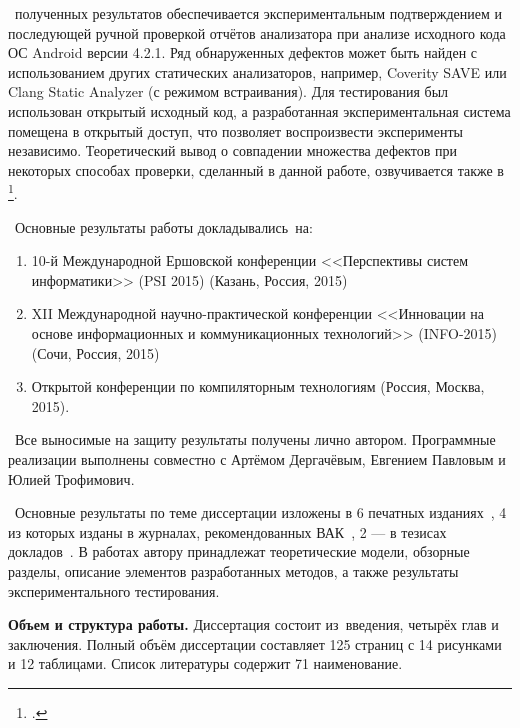 \reliability\ полученных результатов обеспечивается экспериментальным подтверждением и последующей ручной проверкой отчётов анализатора при анализе исходного кода ОС Android версии 4.2.1. Ряд обнаруженных дефектов может быть найден с использованием других статических анализаторов, например, Coverity SAVE или Clang Static Analyzer (с режимом встраивания). Для тестирования был использован открытый исходный код, а разработанная экспериментальная система помещена в открытый доступ, что позволяет воспроизвести эксперименты независимо. Теоретический вывод о совпадении множества дефектов при некоторых способах проверки, сделанный в данной работе, озвучивается также в \footcite{godefroid-comp}.

\probation\
Основные результаты работы докладывались~на:
\begin{enumerate}
 \item 10-й Международной Ершовской конференции <<Перспективы систем информатики>> (PSI 2015) (Казань, Россия, 2015)
 \item XII Международной научно-практической конференции <<Инновации на основе информационных и коммуникационных технологий>> (INFO-2015) (Сочи, Россия, 2015)
 \item Открытой конференции по компиляторным технологиям (Россия, Москва, 2015).
\end{enumerate}


\contribution\ Все выносимые на защиту результаты получены лично автором. Программные реализации выполнены совместно с Артёмом Дергачёвым, Евгением Павловым и Юлией Трофимович.

\publications\ Основные результаты по теме диссертации изложены в 6 печатных изданиях~\cite{summary-impl-mine,summary-intro-mine,summary-inter-unit-mine,summary-checkers-mine,info-2015,psi-2015},
4 из которых изданы в журналах, рекомендованных ВАК~\cite{summary-impl-mine,summary-intro-mine,summary-inter-unit-mine,summary-checkers-mine}, 
2 --- в тезисах докладов~\cite{info-2015,psi-2015}. В работах \cite{summary-impl-mine,summary-intro-mine,summary-inter-unit-mine,summary-checkers-mine} автору принадлежат теоретические модели, обзорные разделы, описание элементов разработанных методов, а также результаты экспериментального тестирования.

\textbf{Объем и структура работы.} Диссертация состоит из~введения, четырёх глав и заключения. Полный объём диссертации составляет 125 страниц с 14 рисунками и 12 таблицами. Список литературы содержит 71 наименование.

